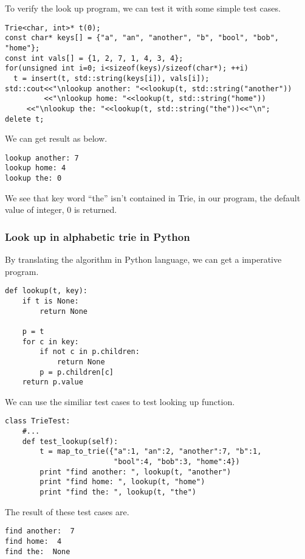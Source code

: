 \documentclass{article}
\begin{document}
To verify the look up program, we can test it with some simple test
cases.

\begin{lstlisting}
Trie<char, int>* t(0);
const char* keys[] = {"a", "an", "another", "b", "bool", "bob", "home"};
const int vals[] = {1, 2, 7, 1, 4, 3, 4};
for(unsigned int i=0; i<sizeof(keys)/sizeof(char*); ++i)
  t = insert(t, std::string(keys[i]), vals[i]);
std::cout<<"\nlookup another: "<<lookup(t, std::string("another"))
         <<"\nlookup home: "<<lookup(t, std::string("home"))
	 <<"\nlookup the: "<<lookup(t, std::string("the"))<<"\n";
delete t;
\end{lstlisting}

We can get result as below.

\begin{verbatim}
lookup another: 7
lookup home: 4
lookup the: 0
\end{verbatim}

We see that key word ``the'' isn't contained in Trie, in our program,
the default value of integer, 0 is returned.

\subsubsection*{Look up in alphabetic trie in Python}
By translating the algorithm in Python language, we can get
a imperative program.

\lstset{language=Python}
\begin{lstlisting}
def lookup(t, key):
    if t is None:
        return None

    p = t
    for c in key:
        if not c in p.children:
            return None
        p = p.children[c]
    return p.value
\end{lstlisting}

We can use the similiar test cases to test looking up function.

\begin{lstlisting}
class TrieTest:
    #...
    def test_lookup(self):
        t = map_to_trie({"a":1, "an":2, "another":7, "b":1,
                         "bool":4, "bob":3, "home":4})
        print "find another: ", lookup(t, "another")
        print "find home: ", lookup(t, "home")
        print "find the: ", lookup(t, "the")
\end{lstlisting}

The result of these test cases are.

\begin{verbatim}
find another:  7
find home:  4
find the:  None
\end{verbatim}
\end{document}
